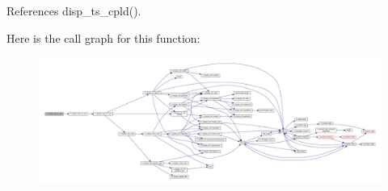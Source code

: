 References disp\+\_\+ts\+\_\+cpld().

Here is the call graph for this function\+:
\nopagebreak
\begin{figure}[H]
\begin{center}
\leavevmode
\includegraphics[width=350pt]{namespacem__display_ae8bac9197ad0a43b71cd5e43a0a20cec_cgraph}
\end{center}
\end{figure}
\mbox{\label{namespacem__display_a2d8cd9c698ef035111fdc53524abe523}} 
